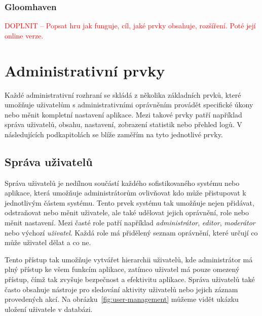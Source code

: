 \subsubsection{Gloomhaven}
\label{subsubsec:popular-board-games-analysis-gloomhaven}
\textcolor{red}{DOPLNIT -- Popsat hru jak funguje, cíl, jaké prvky obsahuje, rozšíření. Poté její online verze.}

\section{Administrativní prvky}
\label{sec:admin-elements}
Každé administrativní rozhraní se skládá z několika základních prvků, které umožňuje uživatelům s administrativními oprávněním provádět specifické úkony nebo měnit kompletní nastavení aplikace. Mezi takové prvky patří například správa uživatelů, obsahu, nastavení, zobrazení statistik nebo přehled logů. V následujících podkapitolách se blíže zaměřím na tyto jednotlivé prvky.

\subsection{Správa uživatelů}
\label{subsec:admin-elements-user-management}
Správa uživatelů je nedílnou součástí každého sofistikovaného systému nebo aplikace, která umožňuje administrátorům ovlivňovat kdo může přistupovat k jednotlivým částem systému. Tento prvek systému tak umožňuje nejen přidávat, odstraňovat nebo měnit uživatele, ale také udělovat jejich oprávnění, role nebo měnit nastavení. Mezi časté role patří například \textit{administrátor}, \textit{editor}, \textit{moderátor} nebo výchozí \textit{uživatel}. Každá role má přidělený seznam oprávnění, které určují co může uživatel dělat a co ne.

Tento přístup tak umožňuje vytvářet hierarchii uživatelů, kde administrátor má plný přístup ke všem funkcím aplikace, zatímco uživatel má pouze omezený přístup, čímž tak zvyšuje bezpečnost a efektivitu aplikace. Správa uživatelů také často obsahuje nástroje pro sledování aktivity uživatelů nebo jejich záznam provedených akcí. Na obrázku~\ref{fig:user-management} můžeme vidět ukázku uložení uživatele v databázi.

